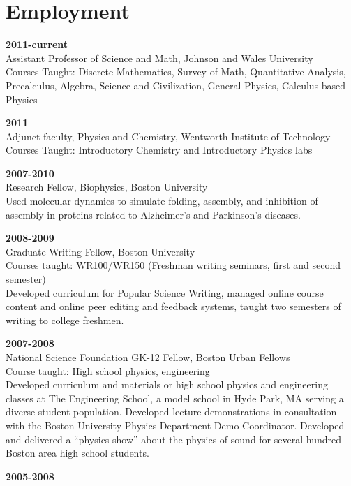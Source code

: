 \documentclass[letterpaper]{article}
\renewenvironment{itemize}{
  \begin{list}{}{
    \setlength{\leftmargin}{1.5em}
  }
}{
  \end{list}
}
\begin{document}
\section*{Employment}
\begin{itemize}
	\item \textbf{2011-current} \\
	Assistant Professor of Science and Math, Johnson and Wales University \\
	Courses Taught: Discrete Mathematics, Survey of Math, Quantitative Analysis, Precalculus, Algebra, Science and Civilization, General Physics, Calculus-based Physics
        \item \textbf{2011}\\
        Adjunct faculty, Physics and Chemistry, Wentworth Institute of Technology \\
        Courses Taught: Introductory Chemistry and Introductory Physics labs
	\item \textbf{2007-2010} \\
	Research Fellow, Biophysics, Boston University \\  
	Used molecular dynamics to simulate folding, assembly,
	and inhibition of assembly in proteins related to Alzheimer's and
	Parkinson's diseases. 
	\item \textbf{2008-2009} \\
	Graduate Writing Fellow, Boston University \\  
	Courses taught: WR100/WR150 (Freshman writing seminars, first and second semester) \\  
	Developed curriculum for Popular Science Writing, managed online course content and online peer editing and feedback systems, taught two semesters of writing to college freshmen.  
	\item \textbf{2007-2008} \\
	National Science Foundation GK-12 Fellow, Boston Urban Fellows \\  
	Course taught: High school physics, engineering  \\
	Developed curriculum and materials or high school physics and engineering classes at The Engineering School, a model school in Hyde Park, MA serving a diverse student population.  Developed lecture demonstrations in consultation with the Boston University Physics Department Demo Coordinator.  Developed and delivered a ``physics show'' about the physics of sound for several hundred Boston area high school students.
	\item \textbf{2005-2008} \\

\end{itemize}
\end{document}
